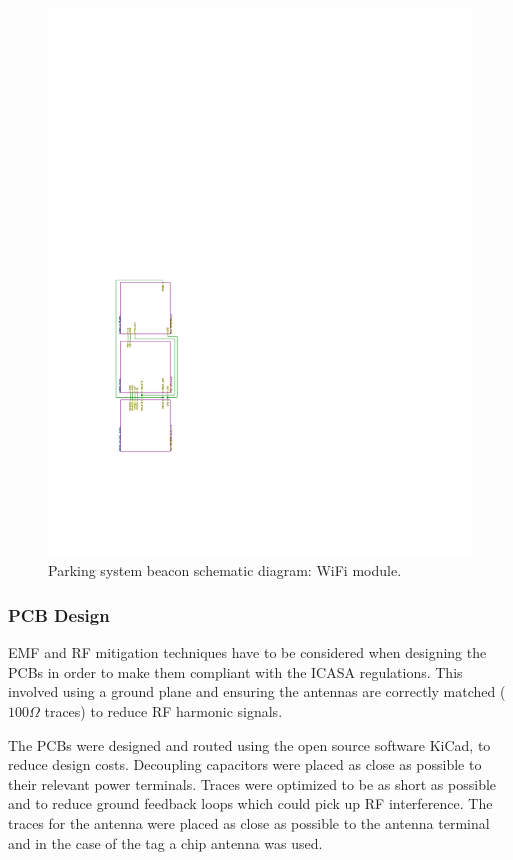 \begin{figure}[H]
\begin{center}
\includegraphics[page=4,scale=1,trim={5cm 9cm 10cm 13cm},clip,angle=-90]{data/parking-system2.pdf}
\caption{Parking system beacon schematic diagram: WiFi module.}
\label{fig:wifi}
\end{center}
\end{figure}

\subsubsection{PCB Design}

EMF and RF mitigation techniques have to be considered when designing the PCBs in order to make them compliant with the ICASA regulations. This involved using a ground plane and ensuring the antennas are correctly matched ($100\Omega$ traces) to reduce RF harmonic signals.

The PCBs were designed and routed using the open source software KiCad, to reduce design costs. Decoupling capacitors were placed as close as possible to their relevant power terminals. Traces were optimized to be as short as possible and to reduce ground feedback loops which could pick up RF interference. The traces for the antenna were placed as close as possible to the antenna terminal and in the case of the tag a chip antenna was used.

